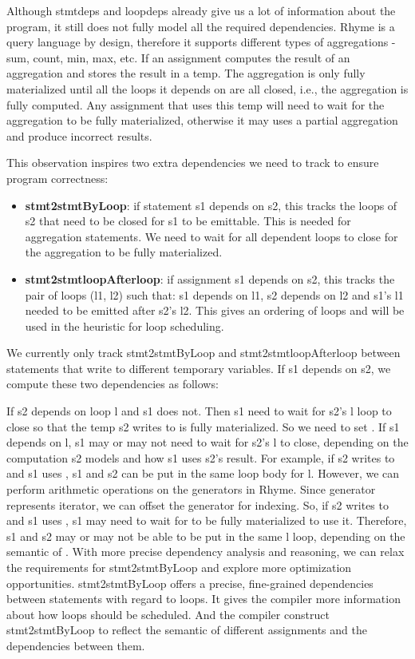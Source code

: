 \documentclass[sigplan, nonacm]{acmart}\settopmatter{printfolios=true,printccs=false,printacmref=false}
\begin{document}
\iffalse
Although stmtdeps and loopdeps already give us a lot of information about the program, it still does not fully model all the required dependencies. Rhyme is a query language by design, therefore it supports different types of aggregations - sum, count, min, max, etc. If an assignment computes the result of an aggregation and stores the result in a temp. The aggregation is only fully materialized until all the loops it depends on are all closed, i.e., the aggregation is fully computed. Any assignment that uses this temp will need to wait for the aggregation to be fully materialized, otherwise it may uses a partial aggregation and produce incorrect results.\par
This observation inspires two extra dependencies we need to track to ensure program correctness:
\begin{itemize}
  \item \textbf{stmt2stmtByLoop}: if statement s1 depends on s2, this tracks the loops of s2 that need to be closed for s1 to be emittable. This is needed for aggregation statements. We need to wait for all dependent loops to close for the aggregation to be fully materialized.
  \item \textbf{stmt2stmtloopAfterloop}: if assignment s1 depends on s2, this tracks the pair of loops (l1, l2) such that: s1 depends on l1, s2 depends on l2 and s1's l1 needed to be emitted after s2's l2. This gives an ordering of loops and will be used in the heuristic for loop scheduling.
\end{itemize}
We currently only track stmt2stmtByLoop and stmt2stmtloopAfterloop between statements that write to different temporary variables. If s1 depends on s2, we compute these two dependencies as follows:\par
If s2 depends on loop l and s1 does not. Then s1 need to wait for s2's l loop to close so that the temp s2 writes to is fully materialized. So we need to set . If s1 depends on l, s1 may or may not need to wait for s2's l to close, depending on the computation s2 models and how s1 uses s2's result. For example, if s2 writes to  and s1 uses , s1 and s2 can be put in the same loop body for l. However, we can perform arithmetic operations on the generators in Rhyme. Since generator represents iterator, we can offset the generator for indexing. So, if s2 writes to  and s1 uses , s1 may need to wait for  to be fully materialized to use it. Therefore, s1 and s2 may or may not be able to be put in the same l loop, depending on the semantic of . With more precise dependency analysis and reasoning, we can relax the requirements for stmt2stmtByLoop and explore more optimization opportunities. stmt2stmtByLoop offers a precise, fine-grained dependencies between statements with regard to loops. It gives the compiler more information about how loops should be scheduled. And the compiler construct stmt2stmtByLoop to reflect the semantic of different assignments and the dependencies between them.
\end{document}
